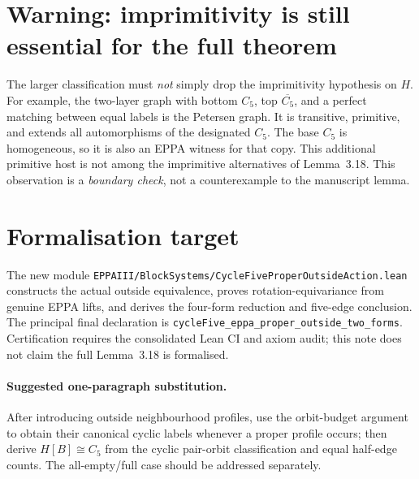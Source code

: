 \documentclass[11pt,a4paper]{article}
\begin{document}
\section*{Warning: imprimitivity is still essential for the full theorem}
The larger classification must \emph{not} simply drop the
imprimitivity hypothesis on \(H\).
For example, the two-layer graph with bottom \(C_5\),
top \(\overline{C_5}\), and a perfect matching between
equal labels is the Petersen graph. It is transitive,
primitive, and extends all automorphisms of the designated
\(C_5\). The base \(C_5\) is homogeneous, so it is
also an EPPA witness for that copy. This additional
primitive host is not among the imprimitive alternatives
of Lemma~3.18. This observation is a \emph{boundary
check}, not a counterexample to the manuscript lemma.

\section*{Formalisation target}
The new module
\texttt{EPPAIII/BlockSystems/CycleFiveProperOutsideAction.lean}
constructs the actual outside equivalence, proves
rotation-equivariance from genuine EPPA lifts,
and derives the four-form reduction and five-edge
conclusion. The principal final declaration is
\texttt{cycleFive\_eppa\_proper\_outside\_two\_forms}.
Certification requires the consolidated Lean CI
and axiom audit; this note does not claim the
full Lemma~3.18 is formalised.

\paragraph{Suggested one-paragraph substitution.}
After introducing outside neighbourhood profiles,
use the orbit-budget argument to obtain their canonical
cyclic labels whenever a proper profile occurs;
then derive \(H[B]\cong C_5\) from the cyclic
pair-orbit classification and equal half-edge counts.
The all-empty/full case should be addressed separately.
\end{document}
